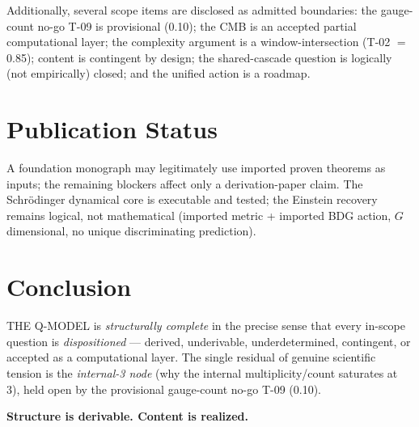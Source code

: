 \documentclass[10pt,a4paper]{article}
\begin{document}
Additionally, several scope items are disclosed as admitted boundaries: the gauge-count
no-go T-09 is provisional (0.10); the CMB is an accepted partial computational layer; the
complexity argument is a window-intersection (T-02 $=$ 0.85); content is contingent by
design; the shared-cascade question is logically (not empirically) closed; and the unified
action is a roadmap.

\section{Publication Status}

\begin{center}
\end{center}

A foundation monograph may legitimately use imported proven theorems as inputs; the
remaining blockers affect only a derivation-paper claim. The Schr\"odinger dynamical core
is executable and tested; the Einstein recovery remains logical, not mathematical
(imported metric + imported BDG action, $G$ dimensional, no unique discriminating
prediction).

\section{Conclusion}

THE Q-MODEL is \emph{structurally complete} in the precise sense that every in-scope
question is \emph{dispositioned} --- derived, underivable, underdetermined, contingent, or
accepted as a computational layer. The single residual of genuine scientific tension is
the \emph{internal-3 node} (why the internal multiplicity/count saturates at 3), held open
by the provisional gauge-count no-go T-09 (0.10).

\begin{center}
\Large\bfseries Structure is derivable. Content is realized.
\end{center}
\end{document}
